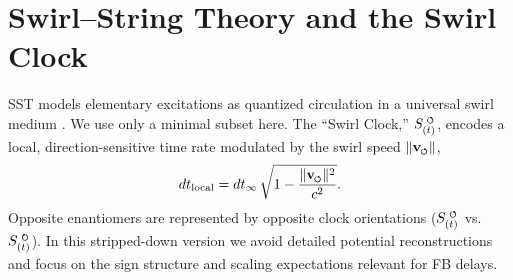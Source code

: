 \documentclass[reprint, aps, prl, longbibliography]{revtex4-2}
\newcommand{\swirlarrow}{%
    \mathchoice{\mkern-2mu\scriptstyle\boldsymbol{\circlearrowleft}}%
    {\mkern-2mu\scriptstyle\boldsymbol{\circlearrowleft}}%
    {\mkern-2mu\scriptscriptstyle\boldsymbol{\circlearrowleft}}%
    {\mkern-2mu\scriptscriptstyle\boldsymbol{\circlearrowleft}}%
}
\newcommand{\swirlarrowcw}{%
    \mathchoice{\mkern-2mu\scriptstyle\boldsymbol{\circlearrowright}}%
    {\mkern-2mu\scriptstyle\boldsymbol{\circlearrowright}}%
    {\mkern-2mu\scriptscriptstyle\boldsymbol{\circlearrowright}}%
    {\mkern-2mu\scriptscriptstyle\boldsymbol{\circlearrowright}}%
}
\newcommand{\vswirl}{\mathbf{v}_{\swirlarrow}}
\newcommand{\SwirlClock}{S_{(t)}^{\ \swirlarrow}}
\newcommand{\SwirlClockcw}{S_{(t)}^{\ \swirlarrowcw}}
\newcommand{\vnorm}{\lVert \vswirl \rVert}
\begin{document}
\section{Swirl--String Theory and the Swirl Clock}
SST models elementary excitations as quantized circulation in a universal swirl medium \cite{IskandaraniSSTCanon}. We use only a minimal subset here. The “Swirl Clock,” $\SwirlClock$, encodes a local, direction-sensitive time rate modulated by the swirl speed $\vnorm$,
\begin{equation}
  dt_{\text{local}} = dt_{\infty}\,\sqrt{1 - \frac{\vnorm^2}{c^2}}.
\end{equation}
Opposite enantiomers are represented by opposite clock orientations ($\SwirlClock$ vs.\ $\SwirlClockcw$). In this stripped-down version we avoid detailed potential reconstructions and focus on the sign structure and scaling expectations relevant for FB delays.
\end{document}
